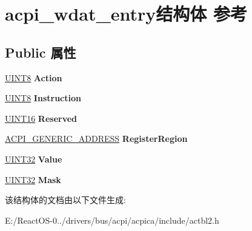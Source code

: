 \hypertarget{structacpi__wdat__entry}{}\section{acpi\+\_\+wdat\+\_\+entry结构体 参考}
\label{structacpi__wdat__entry}
\subsection*{Public 属性}
\begin{DoxyCompactItemize}
\item 
\mbox{\label{structacpi__wdat__entry_a4c447a51064382ff2db974a64bcf8cba}} 
\hyperlink{_processor_bind_8h_ab27e9918b538ce9d8ca692479b375b6a}{U\+I\+N\+T8} {\bfseries Action}
\item 
\mbox{\label{structacpi__wdat__entry_a8d6e84278648ac5c719a3cea8064e78e}} 
\hyperlink{_processor_bind_8h_ab27e9918b538ce9d8ca692479b375b6a}{U\+I\+N\+T8} {\bfseries Instruction}
\item 
\mbox{\label{structacpi__wdat__entry_a028f7d1c8a5ac3e78e9be96ac1c06f76}} 
\hyperlink{_processor_bind_8h_a09f1a1fb2293e33483cc8d44aefb1eb1}{U\+I\+N\+T16} {\bfseries Reserved}
\item 
\mbox{\label{structacpi__wdat__entry_a31ce5a6ee1a214333348b0a0f69be728}} 
\hyperlink{structacpi__generic__address}{A\+C\+P\+I\+\_\+\+G\+E\+N\+E\+R\+I\+C\+\_\+\+A\+D\+D\+R\+E\+SS} {\bfseries Register\+Region}
\item 
\mbox{\label{structacpi__wdat__entry_a044da1c17f42f6f0c298766a946062a0}} 
\hyperlink{_processor_bind_8h_ae1e6edbbc26d6fbc71a90190d0266018}{U\+I\+N\+T32} {\bfseries Value}
\item 
\mbox{\label{structacpi__wdat__entry_a38c14150f92e0718c95cbc48dfa8faf6}} 
\hyperlink{_processor_bind_8h_ae1e6edbbc26d6fbc71a90190d0266018}{U\+I\+N\+T32} {\bfseries Mask}
\end{DoxyCompactItemize}


该结构体的文档由以下文件生成\+:\begin{DoxyCompactItemize}
\item 
E\+:/\+React\+O\+S-\/0../drivers/bus/acpi/acpica/include/actbl2.\+h\end{DoxyCompactItemize}
